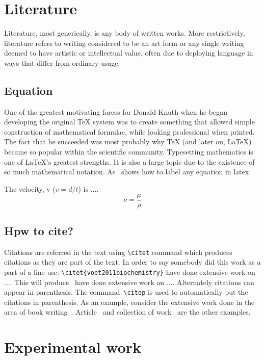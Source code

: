 \documentclass[11pt, a4paper]{article}
\begin{document}
\section{Literature}\label{sec:lit}
Literature, most generically, is any body of written works. More restrictively, literature refers to writing considered to be an art form or any single writing deemed to have artistic or intellectual value, often due to deploying language in ways that differ from ordinary usage.

\subsection{Equation}
One of the greatest motivating forces for Donald Knuth when he began developing the original TeX system was to create something that allowed simple construction of mathematical formulae, while looking professional when printed. The fact that he succeeded was most probably why TeX (and later on, LaTeX) became so popular within the scientific community. Typesetting mathematics is one of LaTeX's greatest strengths. It is also a large topic due to the existence of so much mathematical notation. As~ shows how to label any equation in latex. 

The velocity, v ($v=d/t$) is ....
%
\begin{equation}\label{eq: momentum diff}
\nu = \frac{\mu}{\rho}
\end{equation}

\subsection{Hpw to cite?}
Citations are referred in the text using \verb|\citet| command which produces citations
as they are part of the text. In order to say somebody did this work as a part of a line use: \verb|\citet{voet2011biochemistry}| have done extensive work on .... This will produce~\citet{voet2011biochemistry} have done extensive work on .... Alternately citations can appear in parenthesis. The command~\verb|\citep| is used to automatically put the citations in parenthesis. As an example, consider the extensive work done in the area of book writing~\citep{seifert1991shape}.
Article~\citep{sircar1972adsorption,keh1995particle} and collection of work~\citep{seifert1995morphology} are the other examples.

\section{Experimental work}\label{sec:exp}
\end{document}
